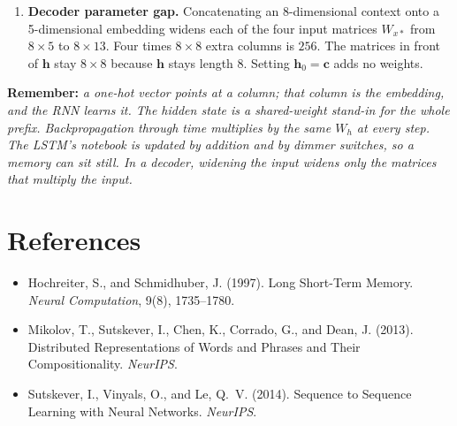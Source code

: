 \documentclass[11pt]{article}
\begin{document}
\begin{enumerate}[leftmargin=*]
        classification from \(\mathbf{h}_T\) (bidirectional when the whole
        input is available); sequence-to-sequence with an encoder context
        \(\mathbf{c}=\mathbf{h}_T\) fed to a left-to-right decoder.
  \item \textbf{Decoder parameter gap.} Concatenating an 8-dimensional
        context onto a 5-dimensional embedding widens each of the four
        input matrices \(W_{x*}\) from \(8\times 5\) to \(8\times 13\).
        Four times \(8\times 8\) extra columns is \(256\). The matrices in
        front of \(\mathbf{h}\) stay \(8\times 8\) because \(\mathbf{h}\)
        stays length 8. Setting \(\mathbf{h}_0=\mathbf{c}\) adds no
        weights.
\end{enumerate}

\noindent\textbf{Remember:}
\emph{a one-hot vector points at a column; that column is the embedding,
and the RNN learns it. The hidden state is a shared-weight stand-in for the
whole prefix. Backpropagation through time multiplies by the same \(W_h\)
at every step. The LSTM's notebook is updated by addition and by dimmer
switches, so a memory can sit still. In a decoder, widening the input
widens only the matrices that multiply the input.}

\section*{References}

\begin{itemize}[leftmargin=*]
  \item Hochreiter, S., and Schmidhuber, J. (1997).
        Long Short-Term Memory. \emph{Neural Computation}, 9(8), 1735--1780.
  \item Mikolov, T., Sutskever, I., Chen, K., Corrado, G., and Dean, J.
        (2013). Distributed Representations of Words and Phrases and Their
        Compositionality. \emph{NeurIPS}.
  \item Sutskever, I., Vinyals, O., and Le, Q.\ V. (2014).
        Sequence to Sequence Learning with Neural Networks. \emph{NeurIPS}.
\end{itemize}
\end{document}
